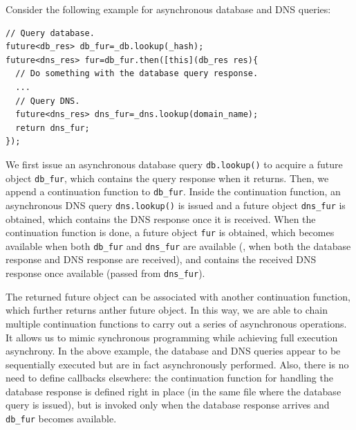 Consider the following example for asynchronous database and DNS queries:

\begin{lstlisting}[style=InlineStyle]
// Query database.
future<db_res> db_fur=_db.lookup(_hash);
future<dns_res> fur=db_fur.then([this](db_res res){
  // Do something with the database query response.
  ...
  // Query DNS.
  future<dns_res> dns_fur=_dns.lookup(domain_name);
  return dns_fur;
});
\end{lstlisting}

\noindent We first issue an asynchronous database query \lstinline[style=InlineStyle]{db.lookup()} to acquire a future object \lstinline[style=InlineStyle]{db_fur}, which contains the query response when it returns. Then, we append a continuation function to \lstinline[style=InlineStyle]{db_fur}. Inside the continuation function, an asynchronous DNS query \lstinline[style=InlineStyle]{dns.lookup()} is issued and a future object \lstinline[style=InlineStyle]{dns_fur} is obtained, which contains the DNS response once it is received. When the continuation function is done, a future object \lstinline[style=InlineStyle]{fur} is obtained, %
 which becomes available when both \lstinline[style=InlineStyle]{db_fur} and \lstinline[style=InlineStyle]{dns_fur} are available (\ie, when both the database response and DNS response are received), and contains the received DNS response once available (passed from \lstinline[style=InlineStyle]{dns_fur}).

The returned future object can be associated with another continuation function, which further returns anther future object. In this way, we are able to chain multiple continuation functions to carry out a series of asynchronous operations. It allows us %
to mimic synchronous programming while achieving full execution asynchrony. In the above example, the database and DNS queries appear to be sequentially executed but are in fact asynchronously performed. %
 Also, there is no need to define callbacks elsewhere: the continuation function for handling the database response is defined right in place (in the same file where the database query is issued), but is invoked only when the database response arrives and \lstinline[style=InlineStyle]{db_fur} becomes available.


